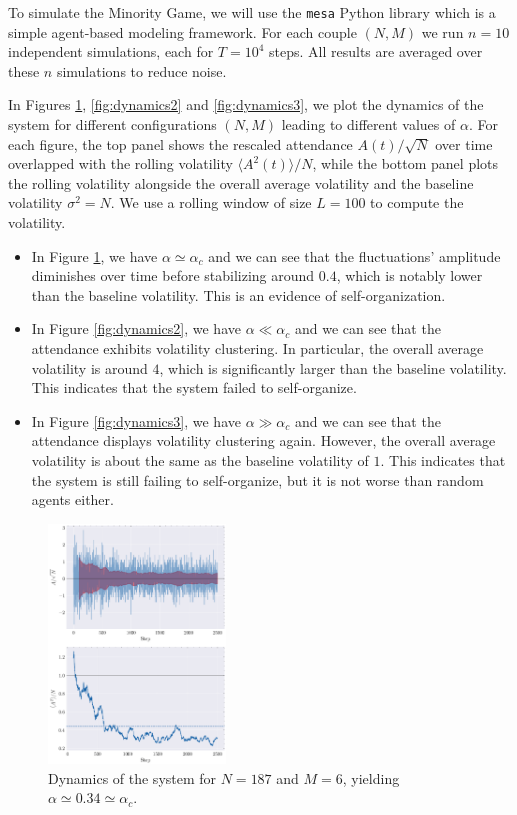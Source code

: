\documentclass[a4paper, amsfonts, amssymb, amsmath, reprint, showkeys, nofootinbib, twoside]{revtex4-1}
\begin{document}
To simulate the Minority Game, we will use the \texttt{mesa} Python library which is a simple agent-based modeling framework. For each couple $(N, M)$ we run $n=10$ independent simulations, each for $T=10^4$ steps. All results are averaged over these $n$ simulations to reduce noise.

In Figures \ref{fig:dynamics1}, \ref{fig:dynamics2} and \ref{fig:dynamics3}, we plot the dynamics of the system for different configurations $(N,M)$ leading to different values of $\alpha$. For each figure, the top panel shows the rescaled attendance $A(t) / \sqrt{N}$ over time overlapped with the rolling volatility $\langle A^2(t) \rangle / N$, while the bottom panel plots the rolling volatility alongside the overall average volatility and the baseline volatility $\sigma^2 = N$. We use a rolling window of size $L=100$ to compute the volatility.
\begin{itemize}
    \item In Figure \ref{fig:dynamics1}, we have $\alpha \simeq \alpha_c$ and we can see that the fluctuations' amplitude diminishes over time before stabilizing around $0.4$, which is notably lower than the baseline volatility. This is an evidence of self-organization.
    \item In Figure \ref{fig:dynamics2}, we have $\alpha \ll \alpha_c$ and we can see that the attendance exhibits volatility clustering. In particular, the overall average volatility is around $4$, which is significantly larger than the baseline volatility. This indicates that the system failed to self-organize.
    \item In Figure \ref{fig:dynamics3}, we have $\alpha \gg \alpha_c$ and we can see that the attendance displays volatility clustering again. However, the overall average volatility is about the same as the baseline volatility of $1$. This indicates that the system is still failing to self-organize, but it is not worse than random agents either.
\end{itemize}

\begin{figure}[H]
    \centering
    \includegraphics[width=0.42\textwidth]{figures/M6_N187.png}
    \caption{Dynamics of the system for $N=187$ and $M=6$, yielding $\alpha \simeq 0.34 \simeq \alpha_c$.}
    \label{fig:dynamics1}
\end{figure}
\end{document}

